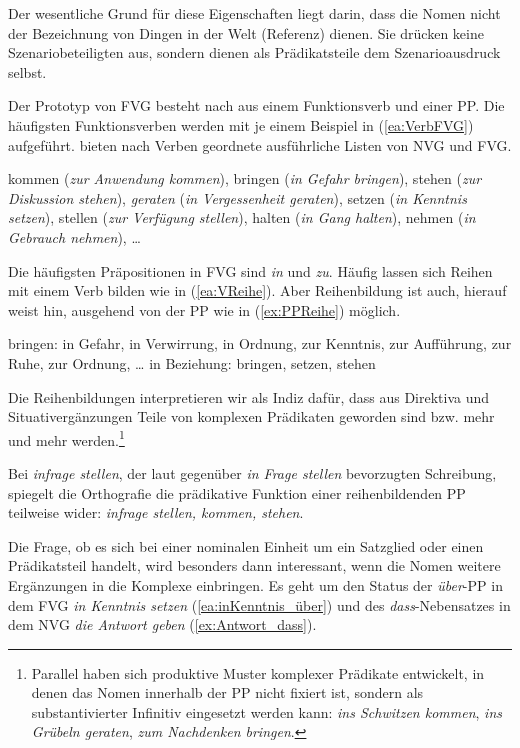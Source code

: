 Der wesentliche Grund für diese Eigenschaften liegt darin, dass die Nomen nicht der Bezeichnung von Dingen in der Welt (Referenz) dienen. Sie drücken keine Szenariobeteiligten aus, sondern dienen als Prädikatsteile dem Szenarioausdruck selbst.

Der Prototyp von FVG besteht nach \citet[333]{Eisenberg2020_Satz} aus einem Funktionsverb und einer PP. Die häufigsten Funktionsverben werden mit je einem Beispiel in (\ref{ea:VerbFVG}) aufgeführt. \citet[70--83]{HelbigBuscha} bieten nach Verben geordnete ausführliche Listen von NVG und FVG.   

\ea \label{ea:VerbFVG} kommen (\textit{zur Anwendung kommen}), bringen (\textit{in Gefahr bringen}), stehen (\textit{zur Diskussion stehen}), \textit{geraten} (\textit{in Vergessenheit geraten}), setzen (\textit{in Kenntnis setzen}), stellen (\textit{zur Verfügung stellen}), halten (\textit{in Gang halten}), nehmen (\textit{in Gebrauch nehmen}), \ldots{}
\z 

Die häufigsten Präpositionen in FVG sind \textit{in} und \textit{zu}. Häufig lassen sich Reihen mit einem Verb bilden wie in (\ref{ea:VReihe}). Aber Reihenbildung ist auch, hierauf weist \citet[334]{Eisenberg2020_Satz} hin, ausgehend von der PP wie in (\ref{ex:PPReihe}) möglich.

\ea \label{ea:ReiheFVG}
\ea \label{ea:VReihe} bringen: in Gefahr, in Verwirrung, in Ordnung, zur Kenntnis, zur Aufführung, zur Ruhe, zur Ordnung, \ldots{} 
\ex \label{ex:PPReihe} in Beziehung: bringen, setzen, stehen
\z 
\z 

Die Reihenbildungen interpretieren wir als Indiz dafür, dass aus Direktiva und Situativergänzungen Teile von komplexen Prädikaten geworden sind bzw. mehr und mehr werden.\footnote{Parallel haben sich produktive Muster komplexer Prädikate entwickelt, in denen das Nomen innerhalb der PP nicht fixiert ist, sondern als substantivierter Infinitiv eingesetzt werden kann: \textit{ins Schwitzen kommen}, \textit{ins Grübeln geraten}, \textit{zum Nachdenken bringen}.} 

Bei \textit{infrage stellen}, der laut \citet{DudenRechtschreibung2024} gegenüber \textit{in Frage stellen} bevorzugten Schreibung, spiegelt die Orthografie die prädikative Funktion einer reihenbildenden PP teilweise wider: \textit{infrage stellen, kommen, stehen}.

Die Frage, ob es sich bei einer nominalen Einheit um ein Satzglied oder einen Prädikatsteil handelt, wird besonders dann interessant, wenn die Nomen weitere Ergänzungen in die Komplexe einbringen. Es geht um den Status der \textit{über}-PP in dem FVG \textit{in Kenntnis setzen} (\ref{ea:inKenntnis_über}) und des \textit{dass}-Nebensatzes in dem NVG \textit{die Antwort geben} (\ref{ex:Antwort_dass}).

